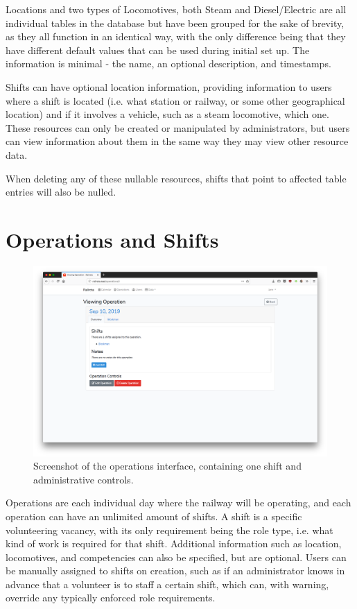 Locations and two types of Locomotives, both Steam and Diesel/Electric are all individual tables in the database but have been grouped for the sake of brevity, as they all function in an identical way, with the only difference being that they have different default values that can be used during initial set up. The information is minimal - the name, an optional description, and timestamps.

Shifts can have optional location information, providing information to users where a shift is located (i.e. what station or railway, or some other geographical location) and if it involves a vehicle, such as a steam locomotive, which one. These resources can only be created or manipulated by administrators, but users can view information about them in the same way they may view other resource data.

When deleting any of these nullable resources, shifts that point to affected table entries will also be nulled.

\section{Operations and Shifts}

\begin{figure}[!ht]
    \centering
    \includegraphics[width=1.0\textwidth]{Figures/screenshot-operations}
    \caption{Screenshot of the operations interface, containing one shift and administrative controls.}
    \label{fig:operations-screenshot}
\end{figure}

Operations are each individual day where the railway will be operating, and each operation can have an unlimited amount of shifts. A shift is a specific volunteering vacancy, with its only requirement being the role type, i.e. what kind of work is required for that shift. Additional information such as location, locomotives, and competencies can also be specified, but are optional. Users can be manually assigned to shifts on creation, such as if an administrator knows in advance that a volunteer is to staff a certain shift, which can, with warning, override any typically enforced role requirements.

